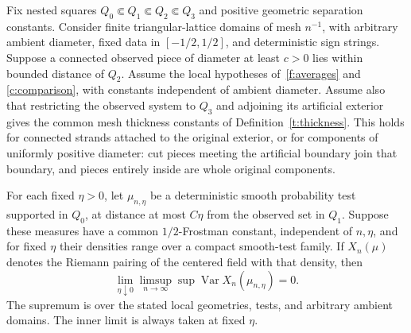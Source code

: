 \begin{corollary}
\label{t:local-boundary-variance}
Fix nested squares $Q_0\Subset Q_1\Subset Q_2\Subset Q_3$ and positive
geometric separation constants.  Consider finite triangular-lattice
domains of mesh $n^{-1}$, with arbitrary ambient diameter, fixed data in
$[-1/2,1/2]$, and deterministic sign strings.  Suppose a connected
observed piece of diameter at least $c>0$ lies within bounded distance of
$Q_2$.  Assume the local hypotheses of~\ref{f:averages} and
\ref{c:comparison}, with constants independent of ambient diameter.
Assume also that restricting the observed system to $Q_3$ and adjoining
its artificial exterior gives the common mesh thickness constants of
Definition~\ref{t:thickness}.  This holds for connected strands attached
to the original exterior, or for components of uniformly positive
diameter: cut pieces meeting the artificial boundary join that boundary,
and pieces entirely inside are whole original components.

For each fixed $\eta>0$, let $\mu_{n,\eta}$ be a deterministic smooth
probability test supported in $Q_0$, at distance at most $C\eta$ from
the observed set in $Q_1$.  Suppose these measures have a common
$1/2$-Frostman constant, independent of $n,\eta$, and for fixed $\eta$
their densities range over a compact smooth-test family.  If $X_n(\mu)$
denotes the Riemann pairing of the centered field with that density, then
\begin{equation}\label{t:local-variance-limit}
 \lim_{\eta\downarrow0}\limsup_{n\to\infty}
 \sup\operatorname{Var}X_n(\mu_{n,\eta})=0.
\end{equation}
The supremum is over the stated local geometries, tests, and arbitrary
ambient domains.  The inner limit is always taken at fixed $\eta$.
\end{corollary}
